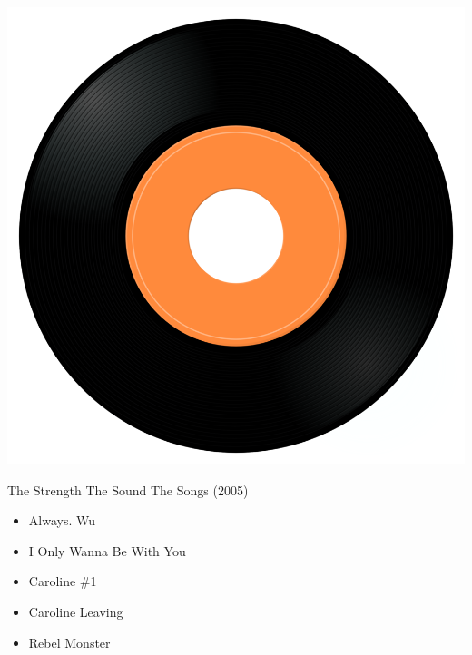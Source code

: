 \begin{minipage}[t]{0.25\textwidth}
\captionsetup{type=figure}
\includegraphics[width=\textwidth]{Images/cover.png}
\caption*{The Strength \/ The Sound \/ The Songs (2005)}
\end{minipage}
\begin{minipage}[t]{0.25\textwidth}\vspace{0pt}
\begin{itemize}[nosep,leftmargin=1em,labelwidth=*,align=left]
	\setlength{\itemsep}{0pt}
	\item Always. Wu
	\item I Only Wanna Be With You
	\item Caroline \#1
	\item Caroline Leaving
	\item Rebel Monster
\end{itemize}
\end{minipage}

